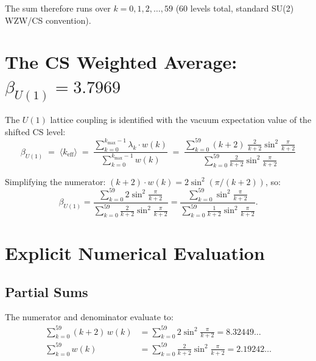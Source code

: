 \documentclass[12pt,a4paper]{article}
\begin{document}
The sum therefore runs over $k = 0, 1, 2, \ldots, 59$ (60 levels total,
standard SU(2) WZW/CS convention).

\section{The CS Weighted Average: $\beta_{U(1)} = 3.7969$}
\label{sec:beta}

The $U(1)$ lattice coupling is identified with the vacuum expectation value
of the shifted CS level:
\begin{equation}
\label{eq:beta-def}
\boxed{
\beta_{U(1)} \;=\; \langle k_{\mathrm{eff}} \rangle
\;=\; \frac{\displaystyle\sum_{k=0}^{k_{\max}-1}
  \lambda_k \cdot w(k)}
  {\displaystyle\sum_{k=0}^{k_{\max}-1} w(k)}
\;=\; \frac{\displaystyle\sum_{k=0}^{59}
  (k+2)\;\frac{2}{k+2}\sin^2\!\frac{\pi}{k+2}}
  {\displaystyle\sum_{k=0}^{59}
  \frac{2}{k+2}\sin^2\!\frac{\pi}{k+2}}
}
\end{equation}

Simplifying the numerator: $(k+2) \cdot w(k) = 2\sin^2(\pi/(k+2))$, so:
\begin{equation}
\beta_{U(1)} = \frac{\displaystyle\sum_{k=0}^{59}
  2\sin^2\!\frac{\pi}{k+2}}
  {\displaystyle\sum_{k=0}^{59}
  \frac{2}{k+2}\sin^2\!\frac{\pi}{k+2}}
= \frac{\displaystyle\sum_{k=0}^{59}
  \sin^2\!\frac{\pi}{k+2}}
  {\displaystyle\sum_{k=0}^{59}
  \frac{1}{k+2}\sin^2\!\frac{\pi}{k+2}}.
\end{equation}

\section{Explicit Numerical Evaluation}
\label{sec:numerics}

\subsection{Partial Sums}

The numerator and denominator evaluate to:
\begin{align}
\sum_{k=0}^{59} (k+2)\,w(k) &= \sum_{k=0}^{59} 2\sin^2\!\frac{\pi}{k+2}
= 8.32449\ldots \label{eq:num}\\[4pt]
\sum_{k=0}^{59} w(k) &= \sum_{k=0}^{59} \frac{2}{k+2}\sin^2\!\frac{\pi}{k+2}
= 2.19242\ldots \label{eq:den}
\end{align}
\end{document}
